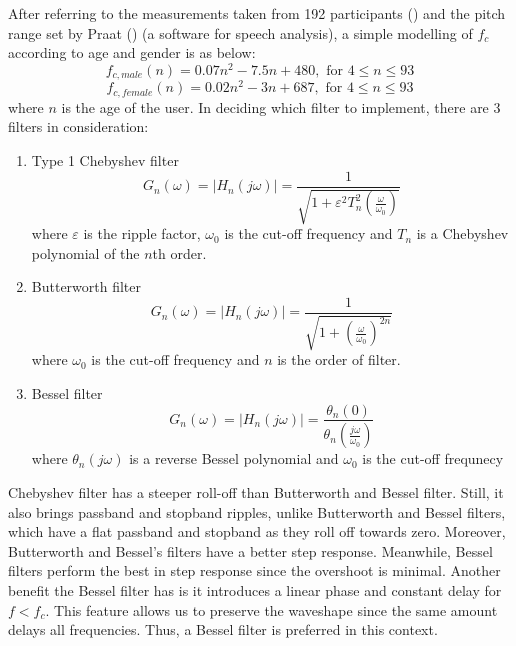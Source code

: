 After referring to the measurements taken from 192 participants (\cite{lifespan})
and the pitch range set by Praat (\cite{f0contour})
(a software for speech analysis), a simple modelling of $f_c$ according to age and gender is as below:
\[f_{c,male}(n) = 0.07n^2 - 7.5n + 480, \text{ for } 4 \leq n\leq 93 \label{male} \] 
\[f_{c,female}(n) = 0.02n^2 - 3n + 687, \text{ for } 4 \leq n \leq 93 \label{female} \] 
where $n$ is the age of the user.
In deciding which filter to implement, there are 3 filters in consideration:
\begin{enumerate}[label=(\alph*)]
    \item Type 1 Chebyshev filter
    \[G_{n}(\omega) = |H_{n}(j\omega)| = {\frac{1}{\sqrt{1+\varepsilon^{2} T_{n}^{2}(\frac{\omega}{\omega_{0}})}}}\]
    where $\varepsilon$  is the ripple factor, $\omega _{0}$ is the cut-off frequency
    and $T_{n}$ is a Chebyshev polynomial of the $n$th order.
    \item Butterworth filter
    \[G_{n}(\omega) = |H_{n}(j\omega)| = {\frac{1}{\sqrt{1+(\frac{\omega}{\omega_{0}})^{2n}}}}\]
    where $\omega _{0}$ is the cut-off frequency and $n$ is the order of filter.
    \item Bessel filter
    \[G_{n}(\omega) = |H_{n}(j\omega)| ={\frac {\theta _{n}(0)}{\theta _{n}(\frac{j\omega}{\omega _{0}})}}\]
    where $\theta _{n}(j\omega)$ is a reverse Bessel polynomial and $\omega _{0}$ is the cut-off frequnecy
\end{enumerate}

Chebyshev filter has a steeper roll-off than Butterworth and Bessel filter. Still, it also brings passband and stopband ripples, 
unlike Butterworth and Bessel filters, which have a flat passband and stopband as they roll off towards zero. Moreover, Butterworth 
and Bessel's filters have a better step response. Meanwhile, Bessel filters perform the best in step response since the overshoot is
minimal. Another benefit the Bessel filter has is it introduces a linear phase and constant delay for $f<f_c$. This
feature allows us to preserve the waveshape since the same amount delays all frequencies.
Thus, a Bessel filter is preferred in this context.

